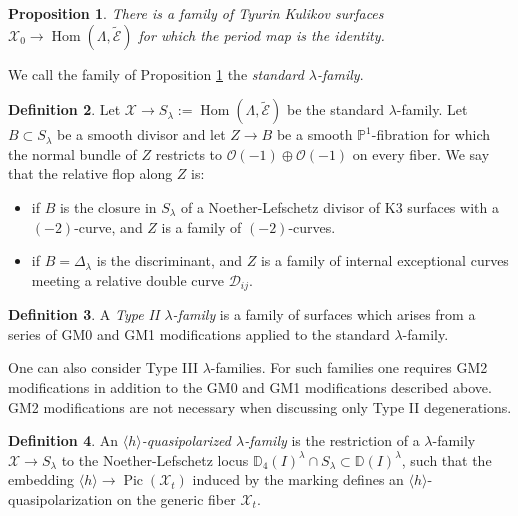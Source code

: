 \documentclass[a4paper]{amsart}
\theoremstyle{definition}
\newtheorem{defn}{Definition}[section]
\theoremstyle{plain}
\newtheorem{prop}[defn]{Proposition}
\theoremstyle{remark}
\newcommand{\PS}{\mathbb{P}}
\newcommand{\D}{\mathbb{D}}
\begin{document}
\begin{prop}\cite[Prop. 7.23]{AE23}\label{AE23 Prop 7.23}
There is a family of Tyurin Kulikov surfaces $\mathcal{X}_0\rightarrow \operatorname{Hom}(\Lambda,\widetilde{\mathcal{E}})$ for which the period map is the identity.
\end{prop}
We call the family of Proposition \ref{AE23 Prop 7.23} the \emph{standard $\lambda$-family}. 

\begin{defn}
Let $\mathcal{X}\rightarrow S_\lambda:=\operatorname{Hom}(\Lambda,\widetilde{\mathcal{E}})$ be the standard $\lambda$-family. Let $B \subset S_\lambda$ be a smooth divisor and let $Z\rightarrow B$ be a smooth $\PS^1$-fibration for which the normal bundle of $Z$ restricts to $\mathcal{O}(-1)\oplus\mathcal{O}(-1)$ on every fiber. We say that the relative flop along $Z$ is:

\begin{itemize}
    \item [(GM0)] if $B$ is the closure in $S_\lambda$ of a Noether-Lefschetz divisor of K3 surfaces with a  $(-2)$-curve, and $Z$ is a family of $(-2)$-curves.
    \item [(GM1)] if $B=\Delta_\lambda$ is the discriminant, and $Z$ is a family of internal exceptional curves meeting a relative double curve $\mathcal{D}_{ij}$.
\end{itemize}

\end{defn}

\begin{defn}\label{def:lambda family}
A \emph{Type II $\lambda$-family} is a family of surfaces which arises from a series of GM0 and GM1 modifications applied to the standard $\lambda$-family.
\end{defn}

One can also consider Type III $\lambda$-families. For such families one requires GM2 modifications in addition to the GM0 and GM1 modifications described above. GM2 modifications are not necessary when discussing only Type II degenerations.

\begin{defn}
An \emph{$\langle h \rangle$-quasipolarized $\lambda$-family} is the restriction of a $\lambda$-family $\mathcal{X}\rightarrow S_\lambda$ to the Noether-Lefschetz locus $\D_{4}(I)^\lambda \cap S_\lambda\subset\D(I)^\lambda$, such that the embedding $\langle h \rangle\rightarrow \operatorname{Pic}(\mathcal{X}_t)$ induced by the marking defines an $\langle h \rangle$-quasipolarization on the generic fiber $\mathcal{X}_t$.
\end{defn}
\end{document}

